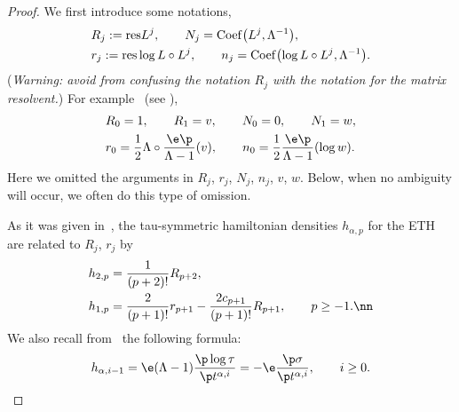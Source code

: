 \begin{proof}
We first introduce some notations,
\begin{align*}
& R_j := {\rm res} L^j, \qquad N_j={\rm Coef}\bigl(L^j, \Lambda^{-1}\bigr), \\
& r_j:= {\rm res} \log L \circ L^j, \qquad n_j= {\rm Coef}\bigl(\log L \circ L^j, \Lambda^{-1}\bigr).
\end{align*}
({\it Warning: avoid from confusing the notation $R_j$ with the notation for the matrix resolvent.})
For example~ (see \cite{Carlet}),
\begin{align*}
& R_0=1, \qquad R_1=v, \qquad N_0=0, \qquad N_1=w, \\
& r_0= \frac12 \Lambda \circ \frac{\e\p}{\Lambda-1} (v), \qquad n_0 = \frac12 \frac{\e\p}{\Lambda-1} (\log w) .
\end{align*}
Here we omitted the arguments in $R_j$, $r_j$, $N_j$, $n_j$, $v$, $w$. Below, when
no ambiguity will occur, we often do this type of omission.

As it was given in~\cite{CDZ}, the tau-symmetric hamiltonian densities $h_{\alpha, p}$ for the ETH
are related to $R_j$, $r_j$ by
\begin{align}
& h_{2, p} = \frac1{(p+2)!} R_{p+2}, \label{CDZtausymm2}\\
& h_{1,p} = \frac2{(p+1)!} r_{p+1} - \frac{2c_{p+1}}{(p+1)!} R_{p+1}, \qquad p\ge-1.\nn
\end{align}
We also recall from~\cite{CDZ} the following formula:
\[
h_{\alpha,i-1} = \e(\Lambda-1) \frac{\p \log \tau}{\p t^{\alpha,i}} = - \e\frac{\p \sigma}{\p t^{\alpha,i}}, \qquad i\ge0.
\]


\end{proof}
